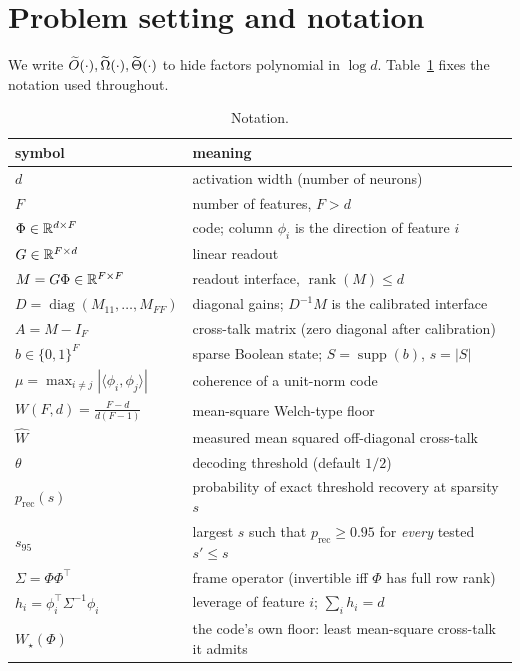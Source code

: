 \section{Problem setting and notation}
\label{sec:setting}

We write $\widetilde{O}(\cdot),\widetilde{\Omega}(\cdot),\widetilde{\Theta}(\cdot)$ to hide factors polynomial in
$\log d$. Table~\ref{tab:notation} fixes the notation used throughout.

\begin{table}[t]
\centering
\caption{Notation.}
\label{tab:notation}
\small
\begin{tabular}{ll}
\toprule
symbol & meaning \\
\midrule
$d$ & activation width (number of neurons) \\
$F$ & number of features, $F>d$ \\
$\Phi\in\mathbb{R}^{d\times F}$ & code; column $\phi_i$ is the direction of feature $i$ \\
$G\in\mathbb{R}^{F\times d}$ & linear readout \\
$M=G\Phi\in\mathbb{R}^{F\times F}$ & readout interface, $\operatorname{rank}(M)\le d$ \\
$D=\operatorname{diag}(M_{11},\dots,M_{FF})$ & diagonal gains; $D^{-1}M$ is the calibrated interface \\
$A=M-I_F$ & cross-talk matrix (zero diagonal after calibration) \\
$b\in\{0,1\}^F$ & sparse Boolean state; $S=\operatorname{supp}(b)$, $s=|S|$ \\
$\mu=\max_{i\ne j}|\langle\phi_i,\phi_j\rangle|$ & coherence of a unit-norm code \\
$W(F,d)=\frac{F-d}{d(F-1)}$ & mean-square Welch-type floor \\
$\widehat W$ & measured mean squared off-diagonal cross-talk \\
$\theta$ & decoding threshold (default $1/2$) \\
$p_{\mathrm{rec}}(s)$ & probability of exact threshold recovery at sparsity $s$ \\
$s_{95}$ & largest $s$ such that $p_{\mathrm{rec}}\ge0.95$ for \emph{every} tested $s'\le s$ \\
$\Sigma=\Phi\Phi^{\top}$ & frame operator (invertible iff $\Phi$ has full row rank) \\
$h_i=\phi_i^{\top}\Sigma^{-1}\phi_i$ & leverage of feature $i$; $\sum_ih_i=d$ \\
$W_{\star}(\Phi)$ & the code's own floor: least mean-square cross-talk it admits \\

\end{tabular}
\end{table}
